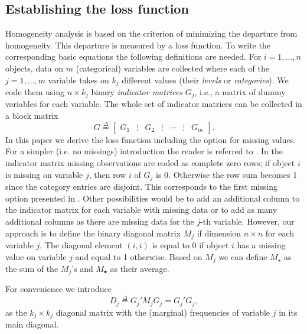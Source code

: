 \documentclass[article, nojss]{jss}
\newcommand{\defi}{\mathop{=}\limits^{\Delta}}
\begin{document}
\subsection{Establishing the loss function}
Homogeneity analysis is based on the criterion of minimizing the departure from homogeneity. This departure is measured by a loss function. To write the corresponding basic equations the following definitions are needed. For $i=1,\ldots,n$ objects, data on $m$ (categorical) variables are collected where each of the $j=1,\ldots,m$ variable takes on $k_j$ different values (their \emph{levels} or \emph{categories}). We code them using $n\times k_j$ binary \emph{indicator matrices} $G_j$, i.e., a matrix of dummy variables for each variable. The whole set of indicator matrices can be collected in a block matrix
\begin{equation}
G\defi\begin{bmatrix}G_1&\vdots&G_2&\vdots&\cdots&\vdots&G_m\end{bmatrix}.
\end{equation}
In this paper we derive the loss function including the option for missing values. For a simpler (i.e. no missings) introduction the reader is referred to \citet[][p. 307--314]{Michailidis+deLeeuw:98}. In the indicator matrix missing observations are coded as complete zero rows; if object $i$ is missing on variable $j$, then row $i$ of $G_j$ is 0. Otherwise the row sum becomes 1 since the category entries are disjoint. This corresponds to the first missing option presented in \citet[\emph{missing data passive}][p. 74]{Gifi:90}. Other possibilities would be to add an additional column to the indicator matrix for each variable with missing data or to add as many additional columns as there are missing data for the $j$-th variable. However, our approach is to define the binary diagonal matrix $M_j$ if dimension $n \times n$ for each variable $j$. The diagonal element $(i,i)$ is equal to 0 if object $i$ has a missing value on variable $j$ and equal to 1 otherwise. Based on $M_j$ we can define $M_\star$ as the sum of the $M_j$'s and $M_\bullet$ as their average.  

For convenience we introduce
\begin{equation}
D_j^{}\defi G_j'M_j^{}G_j^{}=G_j'G_j^{},
\end{equation}
as the $k_j\times k_j$ diagonal matrix with the (marginal) frequencies of variable $j$ in its main diagonal. 
\end{document}
